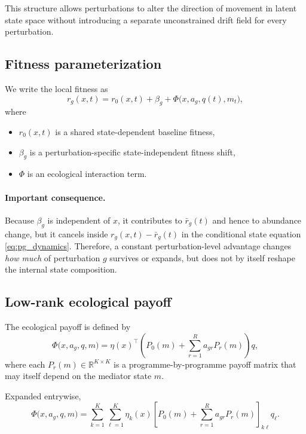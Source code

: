 \documentclass[11pt]{article}
\newcommand{\R}{\mathbb{R}}
\newcommand{\1}{\mathbf{1}}
\theoremstyle{plain}
\begin{document}
This structure allows perturbations to alter the direction of movement in latent state space without introducing a separate unconstrained drift field for every perturbation.

\subsection{Fitness parameterization}

We write the local fitness as
\begin{equation}
 r_g(x,t)=r_0(x,t)+\beta_g+\Phi\big(x,a_g,q(t),m_t\big),
 \label{eq:fitness_param}
\end{equation}
where
\begin{itemize}
    \item $r_0(x,t)$ is a shared state-dependent baseline fitness,
    \item $\beta_g$ is a perturbation-specific state-independent fitness shift,
    \item $\Phi$ is an ecological interaction term.
\end{itemize}

\paragraph{Important consequence.}
Because $\beta_g$ is independent of $x$, it contributes to $\bar r_g(t)$ and hence to abundance change, but it cancels inside $r_g(x,t)-\bar r_g(t)$ in the conditional state equation \eqref{eq:pg_dynamics}. Therefore, a constant perturbation-level advantage changes \emph{how much} of perturbation $g$ survives or expands, but does not by itself reshape the internal state composition.

\subsection{Low-rank ecological payoff}

The ecological payoff is defined by
\begin{equation}
\Phi\big(x,a_g,q,m\big)
=
\eta(x)^\top
\left(
P_0(m)+\sum_{r=1}^{R} a_{gr}P_r(m)
\right)q,
\label{eq:phi_compact}
\end{equation}
where each $P_r(m)\in\R^{K\times K}$ is a programme-by-programme payoff matrix that may itself depend on the mediator state $m$.

Expanded entrywise,
\begin{equation}
\Phi\big(x,a_g,q,m\big)
=
\sum_{k=1}^{K}\sum_{\ell=1}^{K}
\eta_k(x)
\left[
P_0(m)+\sum_{r=1}^{R}a_{gr}P_r(m)
\right]_{k\ell}
q_{\ell}.
\label{eq:phi_entrywise}
\end{equation}
\end{document}
